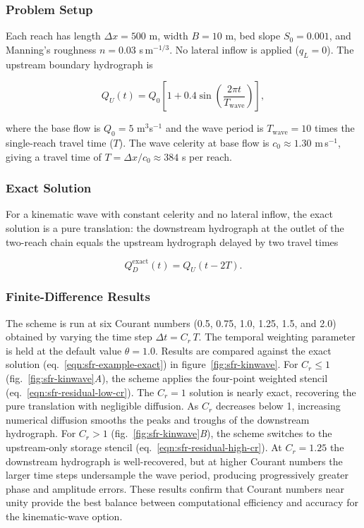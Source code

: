 \subsubsection{Problem Setup}

Each reach has length $\Delta x = 500$ m, width $B = 10$ m, bed slope $S_0 = 0.001$, and Manning's roughness $n = 0.03$ s$\,$m$^{-1/3}$. No lateral inflow is applied ($q_L = 0$). The upstream boundary hydrograph is

\begin{equation}
	\label{eqn:sfr-example-qin}
	Q_U(t) = Q_0 \left[ 1 + 0.4 \sin\!\left( \frac{2\pi t}{T_\mathrm{wave}} \right) \right] ,
\end{equation}

\noindent where the base flow is $Q_0 = 5$ m$^3$s$^{-1}$ and the wave period is $T_\mathrm{wave} = 10$ times the single-reach travel time ($T$). The wave celerity at base flow is $c_0 \approx 1.30$ m$\,$s$^{-1}$, giving a travel time of $T = \Delta x / c_0 \approx 384$ s per reach.

\subsubsection{Exact Solution}

For a kinematic wave with constant celerity and no lateral inflow, the exact solution is a pure translation: the downstream hydrograph at the outlet of the two-reach chain equals the upstream hydrograph delayed by two travel times

\begin{equation}
	\label{eqn:sfr-example-exact}
	Q_D^\mathrm{exact}(t) = Q_U(t - 2T) .
\end{equation}

\subsubsection{Finite-Difference Results}

The \mf scheme is run at six Courant numbers (0.5, 0.75, 1.0, 1.25, 1.5, and 2.0) obtained by varying the time step $\Delta t = C_r \, T$. The temporal weighting parameter is held at the default value $\theta = 1.0$. Results are compared against the exact solution (eq.~\ref{eqn:sfr-example-exact}) in figure~\ref{fig:sfr-kinwave}. For $C_r \le 1$ (fig.~\ref{fig:sfr-kinwave}\textit{A}), the scheme applies the four-point weighted stencil (eq.~\ref{eqn:sfr-residual-low-cr}). The $C_r = 1$ solution is nearly exact, recovering the pure translation with negligible diffusion. As $C_r$ decreases below 1, increasing numerical diffusion smooths the peaks and troughs of the downstream hydrograph. For $C_r > 1$ (fig.~\ref{fig:sfr-kinwave}\textit{B}), the scheme switches to the upstream-only storage stencil (eq.~\ref{eqn:sfr-residual-high-cr}). At $C_r = 1.25$ the downstream hydrograph is well-recovered, but at higher Courant numbers the larger time steps undersample the wave period, producing progressively greater phase and amplitude errors. These results confirm that Courant numbers near unity provide the best balance between computational efficiency and accuracy for the kinematic-wave option.

